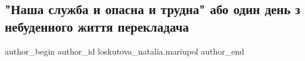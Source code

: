  
 
 
 
 

\subsection{"Наша служба и опасна и трудна" або один день з небуденного життя перекладача}
\label{sec:20_06_2021.fb.loskutova_natalia.mariupol.1._nasha_sluzhba_i_opa}

\ifcmt
 author_begin
   author_id loskutova_natalia.mariupol
 author_end
\fi
